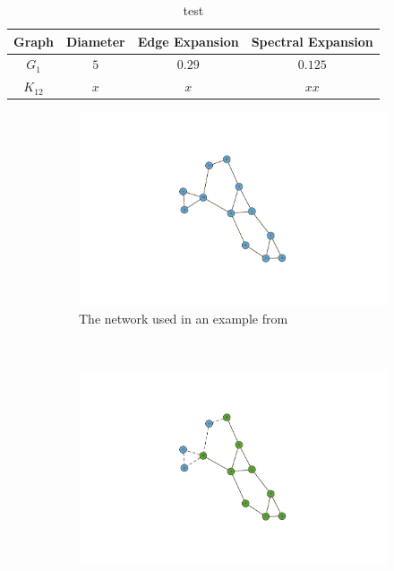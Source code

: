 \documentclass{amsart}
\theoremstyle{definition}
\theoremstyle{remark}
\numberwithin{equation}{section}
\begin{document}
\begin{center}
\begin{table}
\caption{test}
\begin{tabular}{|c|c|c|c|} 
	\hline
	Graph & Diameter & Edge Expansion & Spectral Expansion\\
	\hline
    $G_1$ & $5$ & $0.29$ & $0.125$ \\
	\hline
    $K_{12}$ & $x$ & $x$ & $xx$\\
	\hline
\end{tabular}\label{tab:table1}
\end{table}
\begin{figure}
        \centering
        \begin{subfigure}[b]{0.25\textwidth}
                \includegraphics[scale=0.25]{P.pdf}
                \caption{The network used in an example from \cite{Teix2014}}
                \label{fig:TeixierasNetwork}
        \end{subfigure}
        ~ %
        \centering
        \begin{subfigure}[b]{0.25\textwidth}
                \includegraphics[scale=0.25]{Pmonitoring.pdf}

\end{subfigure}
\end{figure}
\end{center}
\end{document}
